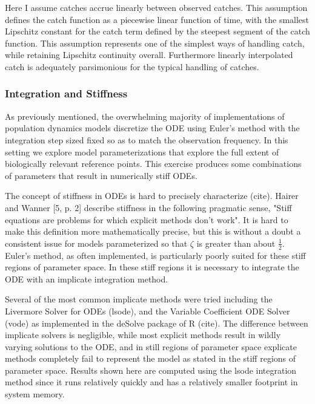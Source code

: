 \documentclass[12pt]{article}
\begin{document}
{%
Here I assume catches accrue linearly between observed catches. This assumption
defines the catch function as a piecewise linear function of time, with the
smallest Lipschitz constant for the catch term defined by the steepest segment
of the catch function. This assumption represents one of the simplest ways of
handling catch, while retaining Lipschitz continuity overall. Furthermore linearly
interpolated catch is adequately parsimonious for the typical handling of catches.

%
\subsubsection{Integration and Stiffness}

%
As previously mentioned, the overwhelming majority of implementations of
population dynamics models discretize the ODE using Euler's method with the
integration step sized fixed so as to match the observation frequency. In this
setting we explore model parameterizations that explore the full extent of
biologically relevant reference points. This exercise produces some
combinations of parameters that result in numerically stiff ODEs.

%
The concept of stiffness in ODEs is hard to precisely characterize
({\color{red}cite}). Hairer and Wanner [5, p. 2] describe stiffness in the
following pragmatic sense, "Stiff equations are problems for which explicit
methods don't work". It is hard to make this definition more mathematically
precise, but this is without a doubt a consistent issue for models parameterized
so that $\zeta$ is greater than about $\frac{1}{2}$. Euler's method, as often
implemented, is particularly poorly suited for these stiff regions of parameter
space. In these stiff regions it is necessary to integrate the ODE with an
implicate integration method.

%
Several of the most common implicate methods were tried including the
Livermore Solver for ODEs (lsode), and the Variable Coefficient ODE Solver
(vode) as implemented in the deSolve package of R ({\color{red}cite}). The
difference between implicate solvers is negligible, while most explicit
methods result in wildly varying solutions to the ODE, and in still regions of
parameter space explicate methods completely fail to represent the model as
stated in the stiff regions of parameter space. Results shown here are computed
using the lsode integration method since it runs relatively quickly and has a
relatively smaller footprint in system memory.


}
\end{document}

